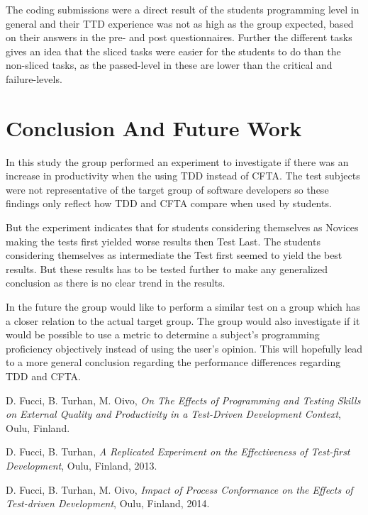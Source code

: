 \documentclass{sig-alternate-05-2015}
\begin{document}
The coding submissions were a direct result of the students programming level in general and their TTD experience was not as high as the group expected, based on their answers in the pre- and post questionnaires. Further the different tasks gives an idea that the sliced tasks were easier for the students to do than the non-sliced tasks, as the passed-level in these are lower than the critical and failure-levels.

\section{Conclusion And Future Work}
In this study the group performed an experiment to investigate if there was an increase in productivity when the using TDD instead of CFTA. The test subjects were not representative of the target group of software developers so these findings only reflect how TDD and CFTA compare when used by students. 

But the experiment indicates that for students considering themselves as Novices making the tests first yielded worse results then Test Last. The students considering themselves as intermediate the Test first seemed to yield the best results. But these results has to be tested further to make any generalized conclusion as there is no clear trend in the results.

In the future the group would like to perform a similar test on a group which has a closer relation to the actual target group. The group would also investigate if it would be possible to use a metric to determine a subject's programming proficiency objectively instead of using the user's opinion. This will hopefully lead to a more general conclusion regarding the performance differences regarding TDD and CFTA.

\begin{thebibliography}{3}

  D. Fucci, B. Turhan, M. Oivo,
  \emph{On The Effects of Programming and Testing Skills on External Quality and Productivity in a Test-Driven Development Context},
  Oulu, Finland.
  
  D. Fucci, B. Turhan,
  \emph{A Replicated Experiment on the Effectiveness of Test-first Development},
  Oulu, Finland,
  2013.
  
  D. Fucci, B. Turhan, M. Oivo,
  \emph{Impact of Process Conformance on the Effects of Test-driven Development},
  Oulu, Finland,
  2014.

\end{thebibliography}
\end{document}
